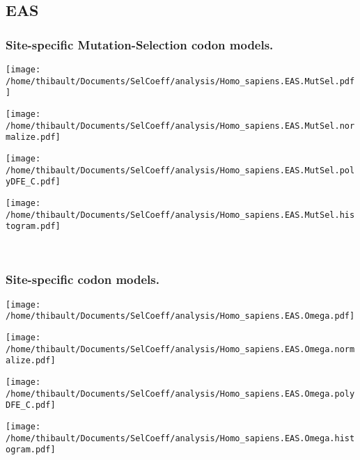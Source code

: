 \subsection{EAS} 
 
\subsubsection*{Site-specific Mutation-Selection codon models.} 
\begin{minipage}{0.49\linewidth} 
\texttt{[image: /home/thibault/Documents/SelCoeff/analysis/Homo\_sapiens.EAS.MutSel.pdf]} 
\end{minipage}
\begin{minipage}{0.49\linewidth} 
\texttt{[image: /home/thibault/Documents/SelCoeff/analysis/Homo\_sapiens.EAS.MutSel.normalize.pdf]} 
\end{minipage}
\begin{minipage}{0.49\linewidth} 
\texttt{[image: /home/thibault/Documents/SelCoeff/analysis/Homo\_sapiens.EAS.MutSel.polyDFE\_C.pdf]} 
\end{minipage}
\begin{minipage}{0.49\linewidth} 
\texttt{[image: /home/thibault/Documents/SelCoeff/analysis/Homo\_sapiens.EAS.MutSel.histogram.pdf]} 
\end{minipage}
\\ 
\subsubsection*{Site-specific codon models.} 
\begin{minipage}{0.49\linewidth} 
\texttt{[image: /home/thibault/Documents/SelCoeff/analysis/Homo\_sapiens.EAS.Omega.pdf]} 
\end{minipage}
\begin{minipage}{0.49\linewidth} 
\texttt{[image: /home/thibault/Documents/SelCoeff/analysis/Homo\_sapiens.EAS.Omega.normalize.pdf]} 
\end{minipage}
\begin{minipage}{0.49\linewidth} 
\texttt{[image: /home/thibault/Documents/SelCoeff/analysis/Homo\_sapiens.EAS.Omega.polyDFE\_C.pdf]} 
\end{minipage}
\begin{minipage}{0.49\linewidth} 
\texttt{[image: /home/thibault/Documents/SelCoeff/analysis/Homo\_sapiens.EAS.Omega.histogram.pdf]} 
\end{minipage}
\\ 
